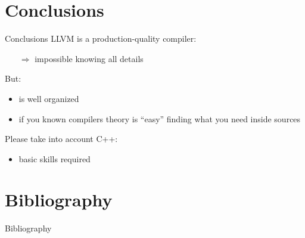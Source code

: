 \documentclass[10pt,mathserif]{beamer}
\begin{document}
\section{Conclusions}
\begin{frame}{Conclusions}
LLVM is a \alert{production-quality} compiler:

\begin{itemize}
\item[$\Rightarrow$] impossible knowing all details
\end{itemize}

But:

\begin{itemize}
\item is well organized
\item if you known compilers theory is ``easy'' finding what you need inside sources
\end{itemize}

Please take into account C++:

\begin{itemize}
\item basic skills required
\end{itemize}
\end{frame}

\section{Bibliography}
\begin{frame}[allowframebreaks]{Bibliography}
\nocite{*}


\end{frame}
\end{document}
